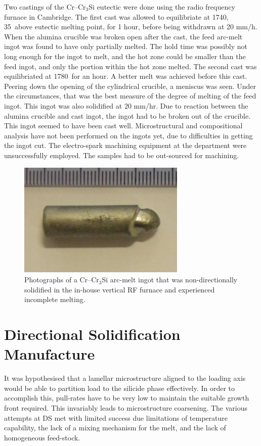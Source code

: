 Two castings of the Cr--Cr$_3$Si eutectic were done using the radio frequency furnace in Cambridge.  The first cast was allowed to equilibriate at 1740\celsius, 35\celsius\ above eutectic melting point, for 1 hour, before being withdrawn at 20 mm/h.  When the alumina crucible was broken open after the cast, the feed arc-melt ingot was found to have only partially melted.  The hold time was possibly not long enough for the ingot to melt, and the hot zone could be smaller than the feed ingot, and only the portion within the hot zone melted.  The second cast was equilibriated at 1780\celsius\ for an hour.  A better melt was achieved before this cast.  Peering down the opening of the cylindrical crucible, a meniscus was seen.  Under the circumstances, that was the best measure of the degree of melting of the feed ingot.  This ingot was also solidified at 20 mm/hr.  Due to reaction between the alumina crucible and cast ingot, the ingot had to be broken out of the crucible.  This ingot seemed to have been cast well.  Microstructural and compositional analysis have not been performed on the ingots yet, due to difficulties in getting the ingot cut.  The electro-spark machining equipment at the department were unsuccessfully employed.  The samples had to be out-sourced for machining.
%
\begin{figure}[H]
\begin{center}
\includegraphics[width=8cm]{rfsmall}
\caption{Photographs of a Cr--Cr$_3$Si arc-melt ingot that was non-directionally solidified in the in-house vertical RF furnace and experienced incomplete melting.}
\label{fig:rfsmall}
\end{center}
\end{figure}
%

\section{Directional Solidification Manufacture}

It was hypothesised that a lamellar microstructure aligned to the loading axis would be able to partition load to the silicide phase effectively.  In order to accomplish this, pull-rates have to be very low to maintain the suitable growth front required.  This invariably leads to microstructure coarsening.  The various attempts at DS met with limited success due limitations of temperature capability, the lack of a mixing mechanism for the melt, and the lack of homogeneous feed-stock.  


